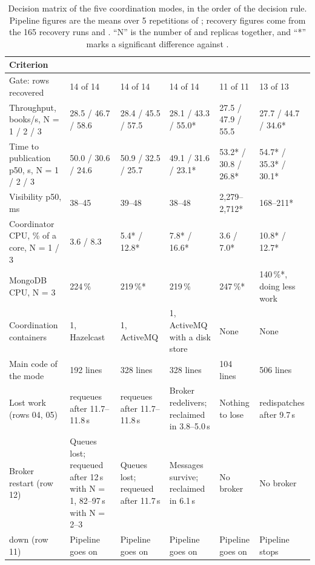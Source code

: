 \begin{table}[ht]
\centering
\scriptsize
\setlength{\tabcolsep}{3.5pt}
\caption{Decision matrix of the five coordination modes, in the order of the decision rule. Pipeline figures are
the means over 5 repetitions of ; recovery figures come from the
165 recovery runs and . ``N'' is the number of  and
 replicas together, and ``*'' marks a significant difference against .}
\label{tab:decision}
\begin{tabularx}{\textwidth}{@{}L{2.45cm}YYYYY@{}}
\toprule
Criterion &  &  &  &  &  \\
\midrule
Gate: rows recovered & 14 of 14 & 14 of 14 & 14 of 14 & 11 of 11 & 13 of 13 \\
\addlinespace
Throughput, books/s, N = 1 / 2 / 3 & 28.5 / 46.7 / 58.6 & 28.4 / 45.5 / 57.5 & 28.1 / 43.3 / 55.0* & 27.5 / 47.9 / 55.5 & 27.7 / 44.7 / 34.6* \\
Time to publication p50, s, N = 1 / 2 / 3 & 50.0 / 30.6 / 24.6 & 50.9 / 32.5 / 25.7 & 49.1 / 31.6 / 23.1* & 53.2* / 30.8 / 26.8* & 54.7* / 35.3* / 30.1* \\
\addlinespace
Visibility p50, ms & 38--45 & 39--48 & 38--48 & 2{,}279--2{,}712* & 168--211* \\
\addlinespace
Coordinator CPU, \% of a core, N = 1 / 3 & 3.6 / 8.3 & 5.4* / 12.8* & 7.8* / 16.6* & 3.6 / 7.0* & 10.8* / 12.7* \\
MongoDB CPU, N = 3 & 224\,\% & 219\,\%* & 219\,\% & 247\,\%* & 140\,\%*, doing less work \\
Coordination containers & 1, Hazelcast & 1, ActiveMQ & 1, ActiveMQ with a disk store & None & None \\
Main code of the mode & 192 lines & 328 lines & 328 lines & 104 lines & 506 lines \\
\addlinespace
Lost work (rows 04, 05) &  requeues after 11.7--11.8\,s &  requeues after 11.7--11.8\,s & Broker redelivers; reclaimed in 3.8--5.0\,s & Nothing to lose &  redispatches after 9.7\,s \\
Broker restart (row 12) & Queues lost; requeued after 12\,s with N = 1, 82--97\,s with N = 2--3 & Queues lost; requeued after 11.7\,s & Messages survive; reclaimed in 6.1\,s & No broker & No broker \\
 down (row 11) & Pipeline goes on & Pipeline goes on & Pipeline goes on & Pipeline goes on & Pipeline stops \\

\end{tabularx}
\end{table}
